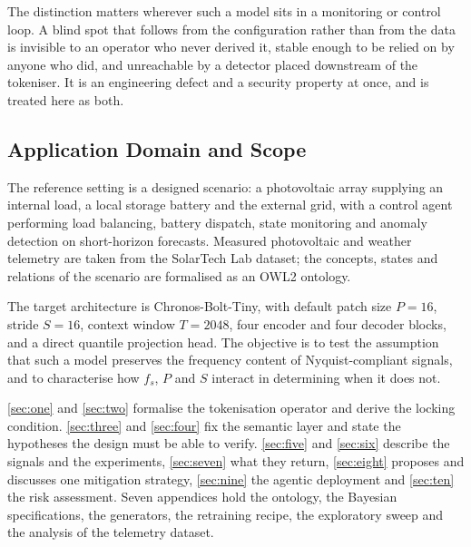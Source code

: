 The distinction matters wherever such a model sits in a monitoring or control loop. A blind spot that follows from the configuration rather than from the data is invisible to an operator who never derived it, stable enough to be relied on by anyone who did, and unreachable by a detector placed downstream of the tokeniser. It is an engineering defect and a security property at once, and is treated here as both.

\subsection*{Application Domain and Scope}
The reference setting is a designed scenario: a photovoltaic array supplying an internal load, a local storage battery and the external grid, with a control agent performing load balancing, battery dispatch, state monitoring and anomaly detection on short-horizon forecasts. Measured photovoltaic and weather telemetry are taken from the SolarTech Lab dataset\autocite{levaPhotovoltaicPowerWeather2020}; the concepts, states and relations of the scenario are formalised as an OWL2 ontology.

The target architecture is Chronos-Bolt-Tiny, with default patch size $P=16$, stride $S=16$, context window $T=2048$, four encoder and four decoder blocks, and a direct quantile projection head\autocite{AmazonChronosbolttinyHugging2025,FastAccurateZeroshot2024a}. The objective is to test the assumption that such a model preserves the frequency content of Nyquist-compliant signals, and to characterise how $f_s$, $P$ and $S$ interact in determining when it does not.

\autoref{sec:one} and \autoref{sec:two} formalise the tokenisation operator and derive the locking condition. \autoref{sec:three} and \autoref{sec:four} fix the semantic layer and state the hypotheses the design must be able to verify. \autoref{sec:five} and \autoref{sec:six} describe the signals and the experiments, \autoref{sec:seven} what they return, \autoref{sec:eight} proposes and discusses one mitigation strategy, \autoref{sec:nine} the agentic deployment and \autoref{sec:ten} the risk assessment. Seven appendices hold the ontology, the Bayesian specifications, the generators, the retraining recipe, the exploratory sweep and the analysis of the telemetry dataset.